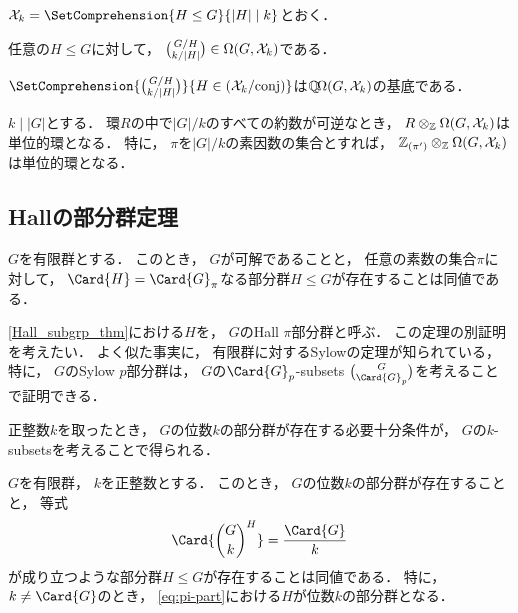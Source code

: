 \documentclass{jlreq}
\newcommand{\FixedPts}[2]{{#1}^{#2}}
\newcommand{\CompReps}[1]{\left(#1\right)}
\newcommand{\Order}[1]{\left| #1 \right|}
\newcommand{\QBurnsideRing}{\Q\!\BurnsideRing}
\begin{document}
	$\mathcal{X}_k = \SetComprehension{H \le G}{\Order{H} \mid k}$とおく．
	
	\begin{proposition}
		任意の$H \le G$に対して，
		$\binom{G/H}{k/\Order{H}} \in \BurnsideRing(G, \mathcal{X}_k)$である．
	\end{proposition}
	
	\begin{conjecture}
		$\SetComprehension{\binom{G/H}{k/\Order{H}}}{H \in \CompReps{\mathcal{X}_k/\mathrm{conj}}}$は$\QBurnsideRing(G, \mathcal{X}_k)$の基底である．
	\end{conjecture}
	
	\begin{conjecture}
		$k \mid \Order{G}$とする．
		環$R$の中で$\Order{G}/k$のすべての約数が可逆なとき，
		$R \otimes_{\mathbb{Z}} \Omega(G, \mathcal{X}_k)$は単位的環となる．
		特に，
		$\pi$を$\Order{G}/k$の素因数の集合とすれば，
		$\mathbb{Z}_{(\pi')} \otimes_{\mathbb{Z}} \Omega(G, \mathcal{X}_k)$は単位的環となる．
	\end{conjecture}
	
	\subsection{Hallの部分群定理}
	
	\begin{theorem}[Hallの部分群定理]\label{Hall_subgrp_thm}
		$G$を有限群とする．
		このとき，
		$G$が可解であることと，
		任意の素数の集合$\pi$に対して，
		$\Card{H} = \Card{G}_\pi$なる部分群$H \le G$が存在することは同値である．
	\end{theorem}
	
	\cref{Hall_subgrp_thm}における$H$を，
	$G$のHall $\pi$部分群と呼ぶ．
	この定理の別証明を考えたい．
	よく似た事実に，
	有限群に対するSylowの定理が知られている，
	特に，
	$G$のSylow $p$部分群は，
	$G$の$\Card{G}_p$-subsets $\binom{G}{\Card{G}_p}$を考えることで証明できる．
	
	正整数$k$を取ったとき，
	$G$の位数$k$の部分群が存在する必要十分条件が，
	$G$の$k$-subsetsを考えることで得られる．
	
	\begin{proposition}\label{prop:Hall-subgroup}
		$G$を有限群，
		$k$を正整数とする．
		このとき，
		$G$の位数$k$の部分群が存在することと，
		等式
		\begin{equation}\label{eq:pi-part}
			\Card{\FixedPts{\binom{G}{k}}{H}} = \frac{\Card{G}}{k}
		\end{equation}
		が成り立つような部分群$H \le G$が存在することは同値である．
		特に，
		$k \ne \Card{G}$のとき，
		\cref{eq:pi-part}における$H$が位数$k$の部分群となる．
	\end{proposition}
	
\end{document}
